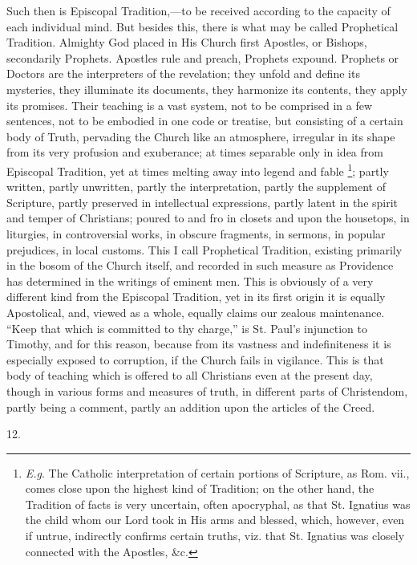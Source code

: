 Such then is Episcopal Tradition,—to be received according
to the capacity of each individual mind. But besides this, there is
what may be called Prophetical Tradition. Almighty God placed in His
Church first Apostles, or Bishops, secondarily Prophets. Apostles rule
and preach, Prophets expound. Prophets or Doctors are the interpreters
of the revelation; they unfold and define its mysteries, they
illuminate its documents, they harmonize its contents, they apply its
promises. Their teaching is a vast system, not to be comprised in a
few sentences, not to be embodied in one code or treatise, but
consisting of a certain body of Truth, pervading the Church like an
atmosphere, irregular in its shape from its very profusion and
exuberance; at times separable only in idea from Episcopal Tradition,
yet at times melting away into legend and fable \footnote{\emph{E.g}. The Catholic interpretation of
certain portions of Scripture, as Rom. vii., comes close upon the
highest kind of Tradition; on the other hand, the Tradition of facts
is very uncertain, often apocryphal, as that St. Ignatius was the
child whom our Lord took in His arms and blessed, which, however, even
if untrue, indirectly confirms certain truths, viz. that St. Ignatius
was closely connected with the Apostles, \&c.}; partly written, partly unwritten, partly the interpretation,
partly the supplement of Scripture, partly preserved in intellectual
expressions, partly latent in the spirit and temper of Christians;
poured to and fro in closets and upon the housetops, in liturgies, in
controversial works, in obscure fragments, in sermons, in popular
prejudices, in local customs. This I call Prophetical Tradition,
existing primarily in the bosom of the Church itself, and recorded in
such measure as Providence has determined in the writings of eminent
men. This is obviously of a very different kind from the Episcopal
Tradition, yet in its first origin it is equally Apostolical, and,
viewed as a whole, equally claims our zealous maintenance. ``Keep
that which is committed to thy charge,'' is St. Paul's injunction
to Timothy, and for this reason, because from its vastness and indefiniteness it is especially exposed to corruption, if the Church
fails in vigilance. This is that body of teaching which is offered to
all Christians even at the present day, though in various forms and
measures of truth, in different parts of Christendom, partly being a
comment, partly an addition upon the articles of the Creed.

12.

